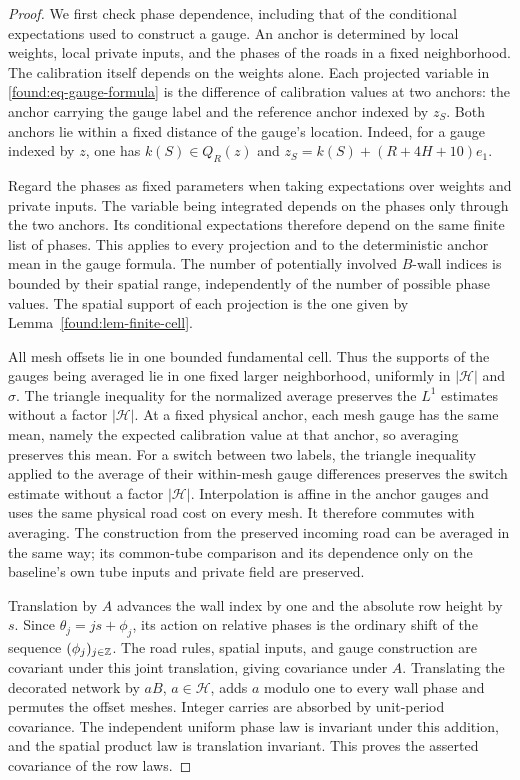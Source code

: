 \begin{proof}
We first check phase dependence, including that of the conditional
expectations used to construct a gauge.  An anchor is determined by
local weights, local private inputs, and the phases of the roads in a
fixed neighborhood.  The calibration itself depends on the weights
alone.  Each projected variable in
\eqref{found:eq-gauge-formula} is the difference of calibration values
at two anchors: the anchor carrying the gauge label and the reference
anchor indexed by $z_S$.  Both anchors lie within a fixed distance of
the gauge's location.  Indeed, for a gauge indexed by $z$, one has
$k(S)\in Q_R(z)$ and $z_S=k(S)+(R+4H+10)e_1$.

Regard the phases as fixed parameters when taking expectations over
weights and private inputs.  The variable being integrated depends on
the phases only through the two anchors.  Its conditional expectations
therefore depend on the same finite list of phases.  This applies to
every projection and to the deterministic anchor mean in the gauge
formula.  The number of potentially involved $B$-wall indices is
bounded by their spatial range, independently of the number of possible
phase values.  The spatial support of each projection is the one given
by Lemma~\ref{found:lem-finite-cell}.

All mesh offsets lie in one bounded fundamental cell.  Thus the supports
of the gauges being averaged lie in one fixed larger neighborhood,
uniformly in $|\mathcal H|$ and $\sigma$.  The triangle inequality for
the normalized average preserves the $L^1$ estimates without a factor
$|\mathcal H|$. At a fixed physical anchor, each mesh gauge has the
same mean, namely the expected calibration value at that anchor, so
averaging preserves this mean. For a switch between two labels, the
triangle inequality applied to the average of their within-mesh gauge
differences preserves the switch estimate without a factor
$|\mathcal H|$. Interpolation is affine in the anchor
gauges and uses the same physical road cost on every mesh.  It therefore
commutes with averaging.  The construction from the preserved incoming
road can be averaged in the same way; its common-tube comparison and its
dependence only on the baseline's own tube inputs and private field are
preserved.

Translation by $A$ advances the wall index by one and the absolute row
height by $s$.  Since $\theta_j=js+\phi_j$, its action on relative
phases is the ordinary shift of the sequence $(\phi_j)_{j\in\mathbb Z}$.
The road rules, spatial inputs, and gauge construction are covariant
under this joint translation, giving covariance under $A$.  Translating
the decorated network by $aB$, $a\in\mathcal H$, adds $a$ modulo one
to every wall phase and permutes the offset meshes.  Integer carries
are absorbed by unit-period covariance.  The independent uniform phase
law is invariant under this addition, and the spatial product law is
translation invariant.  This proves the asserted covariance of the row
laws.


\end{proof}
